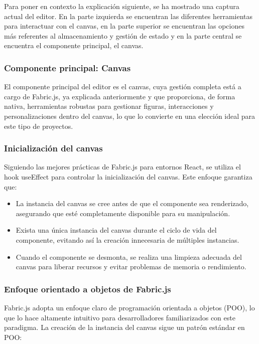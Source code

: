 Para poner en contexto la explicación siguiente, se ha mostrado una captura actual del editor. En la parte izquierda se encuentran las diferentes herramientas para interactuar con el canvas, en la parte superior se encuentran las opciones más referentes al almacenamiento y gestión de estado y en la parte central se encuentra el componente principal, el canvas.

\subsubsection{Componente principal: Canvas}

El componente principal del editor es el canvas, cuya gestión completa está a cargo de Fabric.js, ya explicada anteriormente y que proporciona, de forma nativa, herramientas robustas para gestionar figuras, interacciones y personalizaciones dentro del canvas, lo que lo convierte en una elección ideal para este tipo de proyectos.

\subsubsection{Inicialización del canvas}

Siguiendo las mejores prácticas de Fabric.js para entornos React, se utiliza el hook useEffect para controlar la inicialización del canvas. Este enfoque garantiza que:

\begin{itemize}
    \item La instancia del canvas se cree antes de que el componente sea renderizado, asegurando que esté completamente disponible para su manipulación.
    \item Exista una única instancia del canvas durante el ciclo de vida del componente, evitando así la creación innecesaria de múltiples instancias.
    \item Cuando el componente se desmonta, se realiza una limpieza adecuada del canvas para liberar recursos y evitar problemas de memoria o rendimiento.
\end{itemize}

\subsubsection{Enfoque orientado a objetos de Fabric.js}

Fabric.js adopta un enfoque claro de programación orientada a objetos (POO), lo que lo hace altamente intuitivo para desarrolladores familiarizados con este paradigma. La creación de la instancia del canvas sigue un patrón estándar en POO:

